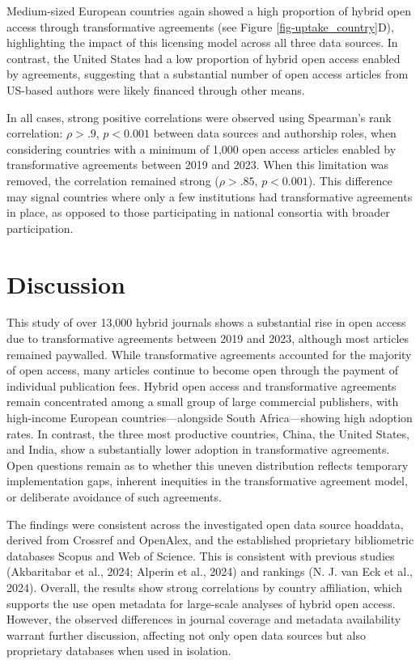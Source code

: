 \documentclass[a4paper,man,floatsintext,longtable,noextraspace,10pt]{apa6}
\begin{document}
Medium-sized European countries again showed a high proportion of hybrid
open access through transformative agreements (see Figure
\ref{fig-uptake_country}D), highlighting the impact of this licensing
model across all three data sources. In contrast, the United States had
a low proportion of hybrid open access enabled by agreements, suggesting
that a substantial number of open access articles from US-based authors
were likely financed through other means.

In all cases, strong positive correlations were observed using
Spearman's rank correlation: \(\rho > .9\), \(p < 0.001\) between data
sources and authorship roles, when considering countries with a minimum
of 1,000 open access articles enabled by transformative agreements
between 2019 and 2023. When this limitation was removed, the correlation
remained strong (\(\rho > .85\), \(p < 0.001\)). This difference may
signal countries where only a few institutions had transformative
agreements in place, as opposed to those participating in national
consortia with broader participation.

\section{Discussion}\label{discussion}

This study of over 13,000 hybrid journals shows a substantial rise in
open access due to transformative agreements between 2019 and 2023,
although most articles remained paywalled. While transformative
agreements accounted for the majority of open access, many articles
continue to become open through the payment of individual publication
fees. Hybrid open access and transformative agreements remain
concentrated among a small group of large commercial publishers, with
high-income European countries---alongside South Africa---showing high
adoption rates. In contrast, the three most productive countries, China,
the United States, and India, show a substantially lower adoption in
transformative agreements. Open questions remain as to whether this
uneven distribution reflects temporary implementation gaps, inherent
inequities in the transformative agreement model, or deliberate
avoidance of such agreements.

The findings were consistent across the investigated open data source
hoaddata, derived from Crossref and OpenAlex, and the established
proprietary bibliometric databases Scopus and Web of Science. This is
consistent with previous studies (Akbaritabar et al., 2024; Alperin et
al., 2024) and rankings (N. J. van Eck et al., 2024). Overall, the
results show strong correlations by country affiliation, which supports
the use open metadata for large-scale analyses of hybrid open access.
However, the observed differences in journal coverage and metadata
availability warrant further discussion, affecting not only open data
sources but also proprietary databases when used in isolation.
\end{document}
